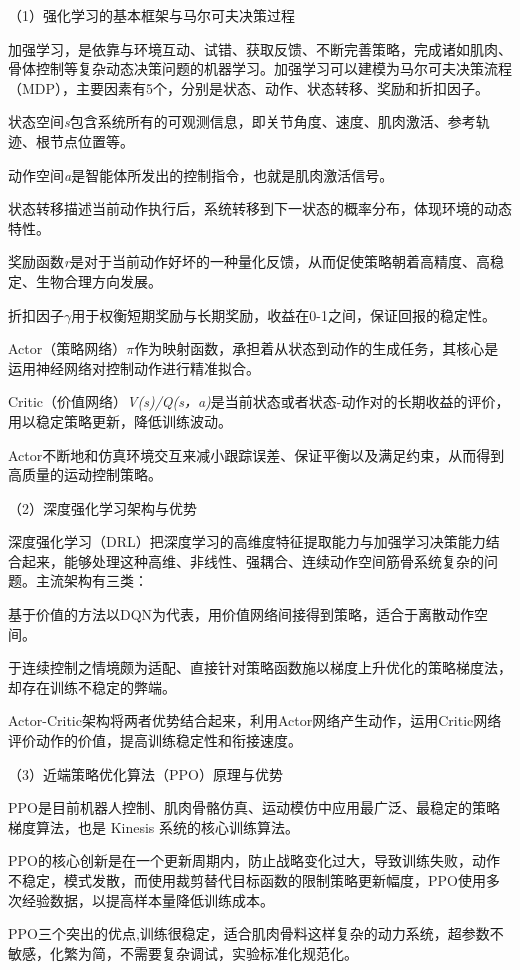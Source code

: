 （1）强化学习的基本框架与马尔可夫决策过程

加强学习，是依靠与环境互动、试错、获取反馈、不断完善策略，完成诸如肌肉、骨体控制等复杂动态决策问题的机器学习。加强学习可以建模为马尔可夫决策流程（MDP），主要因素有5个，分别是状态、动作、状态转移、奖励和折扣因子。

状态空间\emph{s}包含系统所有的可观测信息，即关节角度、速度、肌肉激活、参考轨迹、根节点位置等。

动作空间\emph{a}是智能体所发出的控制指令，也就是肌肉激活信号。

状态转移描述当前动作执行后，系统转移到下一状态的概率分布，体现环境的动态特性。

奖励函数\emph{r}是对于当前动作好坏的一种量化反馈，从而促使策略朝着高精度、高稳定、生物合理方向发展。

折扣因子\emph{$\gamma$}用于权衡短期奖励与长期奖励，收益在0-1之间，保证回报的稳定性。

Actor（策略网络）\emph{$\pi$}作为映射函数，承担着从状态到动作的生成任务，其核心是运用神经网络对控制动作进行精准拟合。

Critic（价值网络）\emph{V(s)/Q(s，a)}是当前状态或者状态-动作对的长期收益的评价，用以稳定策略更新，降低训练波动。

Actor不断地和仿真环境交互来减小跟踪误差、保证平衡以及满足约束，从而得到高质量的运动控制策略。

（2）深度强化学习架构与优势

深度强化学习（DRL）把深度学习的高维度特征提取能力与加强学习决策能力结合起来，能够处理这种高维、非线性、强耦合、连续动作空间筋骨系统复杂的问题。主流架构有三类：

基于价值的方法以DQN为代表，用价值网络间接得到策略，适合于离散动作空间。

于连续控制之情境颇为适配、直接针对策略函数施以梯度上升优化的策略梯度法，却存在训练不稳定的弊端。

Actor-Critic架构将两者优势结合起来，利用Actor网络产生动作，运用Critic网络评价动作的价值，提高训练稳定性和衔接速度。

（3）近端策略优化算法（PPO）原理与优势

PPO是目前机器人控制、肌肉骨骼仿真、运动模仿中应用最广泛、最稳定的策略梯度算法，也是
Kinesis 系统的核心训练算法。

PPO的核心创新是在一个更新周期内，防止战略变化过大，导致训练失败，动作不稳定，模式发散，而使用裁剪替代目标函数的限制策略更新幅度，PPO使用多次经验数据，以提高样本量降低训练成本。

PPO三个突出的优点,训练很稳定，适合肌肉骨料这样复杂的动力系统，超参数不敏感，化繁为简，不需要复杂调试，实验标准化规范化。

